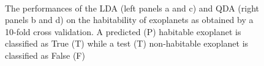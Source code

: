 \documentclass[
12pt, %
a4paper, %
oneside, %
headinclude,footinclude, %
BCOR5mm, %
]{scrartcl}
\begin{document}
\begin{figure}[h]
  \centering
{}
\\
\caption{The performances of the LDA (left panels a and c) and QDA (right panels b and d) on the habitability of exoplanets as obtained by a 10-fold cross validation.   A predicted (P) habitable exoplanet is classified as True (T) while a test (T) non-habitable exoplanet is classified as False (F)}
\label{LDA+QDA_results}
\end{figure}
\end{document}
